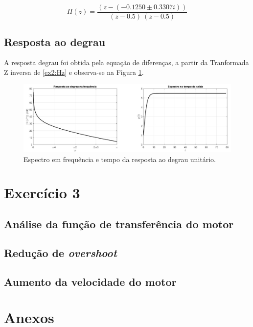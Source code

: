 \documentclass[a4paper,12pt,oneside,openany,table,xcdraw]{article}
\begin{document}
\begin{equation} \label{ex2:pz}
H(z) = \dfrac{(z-(-0.1250 \pm 0.3307i))}{(z-0.5)\ (z-0.5)}
\end{equation}
 
\vspace{0.3cm}
\subsection{Resposta ao degrau}
A resposta degrau foi obtida pela equação de diferenças, a partir da Tranformada Z inversa de \ref{ex2:Hz} e observa-se na Figura \ref{ex2:u}.

\vspace{0.2cm}
\begin{figure}[H]
\centering
\includegraphics[width=15cm]{ex2-u}
\caption{Espectro em frequência e tempo da resposta ao degrau unitário.}
\label{ex2:u}
\end{figure}

\vspace{0.3cm}
\section{Exercício 3}
\subsection{Análise da função de transferência do motor}

\subsection{Redução de \emph{overshoot}}


\subsection{Aumento da velocidade do motor}



\newpage
\section{Anexos}
\end{document}
